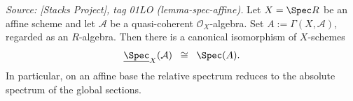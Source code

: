 \begin{theorem}
  \label{thm:relative_spec_affine_base}
  
  \textit{Source: [Stacks Project], tag 01LO (lemma-spec-affine).}
  Let \(X = \Spec R\) be an affine scheme and let \(\mathcal{A}\) be a quasi-coherent
  \(\mathcal{O}_X\)-algebra. Set \(A := \Gamma(X, \mathcal{A})\), regarded as an
  \(R\)-algebra. Then there is a canonical isomorphism of \(X\)-schemes
  \[
    \underline{\Spec}_X(\mathcal{A}) \;\;\cong\;\; \Spec(A).
  \]
  In particular, on an affine base the relative spectrum reduces to the absolute
  spectrum of the global sections.
\end{theorem}

